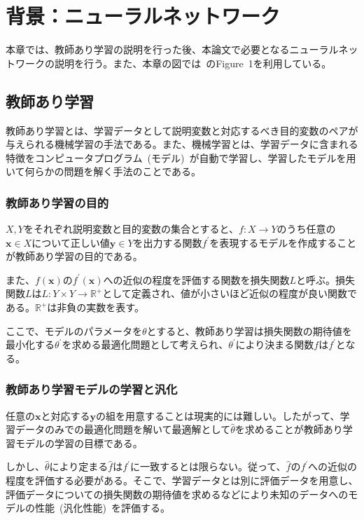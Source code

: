 \chapter{背景：ニューラルネットワーク}

本章では、教師あり学習の説明を行った後、本論文で必要となるニューラルネットワークの説明を行う。また、本章の図では~\cite{pix2pix}のFigure~1を利用している。

\section{教師あり学習}

教師あり学習とは、学習データとして説明変数と対応するべき目的変数のペアが与えられる機械学習の手法である。また、機械学習とは、学習データに含まれる特徴をコンピュータプログラム~(モデル)~が自動で学習し、学習したモデルを用いて何らかの問題を解く手法のことである。

\subsection{教師あり学習の目的}

$X,Y$をそれぞれ説明変数と目的変数の集合とすると、$f:X\rightarrow Y$のうち任意の$\boldsymbol{x} \in X$について正しい値$\boldsymbol{y} \in Y$を出力する関数$f^{'}$を表現するモデルを作成することが教師あり学習の目的である。

また、$f(\boldsymbol{x})$の$f^{'}(\boldsymbol{x})$への近似の程度を評価する関数を損失関数$L$と呼ぶ。損失関数$L$は$L:Y \times Y \rightarrow \mathbb{R}^+$として定義され、値が小さいほど近似の程度が良い関数である。$\mathbb{R}^+$は非負の実数を表す。

ここで、モデルのパラメータを$\theta$とすると、教師あり学習は損失関数の期待値を最小化する$\theta^{'}$を求める最適化問題として考えられ、$\theta^{'}$により決まる関数$f$は$f^{'}$となる。

\subsection{教師あり学習モデルの学習と汎化}

任意の$\boldsymbol{x}$と対応する$\boldsymbol{y}$の組を用意することは現実的には難しい。したがって、学習データのみでの最適化問題を解いて最適解として$\hat{\theta}$を求めることが教師あり学習モデルの学習の目標である。

しかし、$\hat{\theta}$により定まる$\hat{f}$は$f^{'}$に一致するとは限らない。従って、$\hat{f}$の$f^{'}$への近似の程度を評価する必要がある。そこで、学習データとは別に評価データを用意し、評価データについての損失関数の期待値を求めるなどにより未知のデータへのモデルの性能~(汎化性能)~を評価する。


